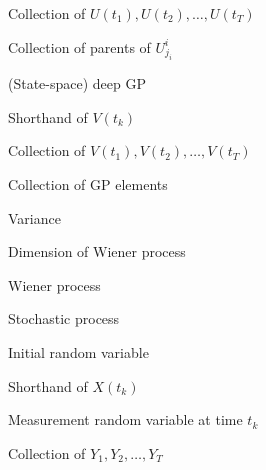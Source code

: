 \begin{description}[style=multiline,leftmargin=3cm]
\item[$U_{1:T}$] Collection of $U(t_1), U(t_2),\ldots, U(t_T)$
\item[$\mathcal{U}^i$] Collection of parents of $U^i_{j_i}$
\item[$V$] (State-space) deep GP
\item[$V_k$] Shorthand of $V(t_k)$
\item[$V_{1:T}$] Collection of $V(t_1), V(t_2),\ldots, V(t_T)$
\item[$\mathcal{V}$] Collection of GP elements
\item[$\varrsym$] Variance
\item[$w$] Dimension of Wiener process
\item[$W$] Wiener process
\item[$X$] Stochastic process
\item[$X_0$] Initial random variable
\item[$X_k$] Shorthand of $X(t_k)$
\item[$Y_k$] Measurement random variable at time $t_k$
\item[$Y_{1:T}$] Collection of $Y_1, Y_2,\ldots, Y_T$


\end{description}
